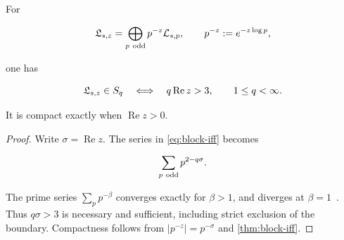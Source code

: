 \begin{corollary}
\label{cor:phase-diagram}
For

\begin{equation}
 \fL_{s,z}=\bigoplus_{p\ \odd}p^{-z}\cL_{s,p},
 \qquad p^{-z}:=e^{-z\log p},
 \label{eq:dirichlet-block}
\end{equation}

one has

\begin{equation}
 \mathfrak L_{s,z}\in S_{q}
 \quad\Longleftrightarrow\quad
 q\operatorname{Re}z>3,
 \qquad 1\le q<\infty.
 \label{eq:phase-diagram}
\end{equation}

It is compact exactly when \(\operatorname{Re}z>0\).
\end{corollary}

\begin{proof}
Write \(\sigma=\operatorname{Re}z\).  The series in
\cref{eq:block-iff} becomes

\[
 \sum_{p\ \odd}p^{2-q\sigma}.
\]

The prime series \(\sum_p p^{-\beta}\) converges exactly for
\(\beta>1\), and diverges at \(\beta=1\)~\citep{apostol1976}.  Thus
\(q\sigma>3\) is necessary and sufficient, including strict exclusion of
the boundary.  Compactness follows from
\(|p^{-z}|=p^{-\sigma}\) and \cref{thm:block-iff}.
\end{proof}

